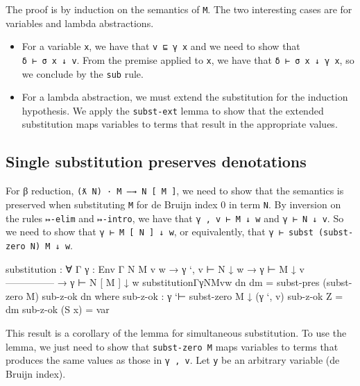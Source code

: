 The proof is by induction on the semantics of \texttt{M}. The two
interesting cases are for variables and lambda abstractions.

\begin{itemize}
\item
  For a variable \texttt{x}, we have that \texttt{v\ ⊑\ γ\ x} and we
  need to show that \texttt{δ\ ⊢\ σ\ x\ ↓\ v}. From the premise applied
  to \texttt{x}, we have that \texttt{δ\ ⊢\ σ\ x\ ↓\ γ\ x}, so we
  conclude by the \texttt{sub} rule.
\item
  For a lambda abstraction, we must extend the substitution for the
  induction hypothesis. We apply the \texttt{subst-ext} lemma to show
  that the extended substitution maps variables to terms that result in
  the appropriate values.
\end{itemize}

\hypertarget{single-substitution-preserves-denotations}{%
\subsection{Single substitution preserves
denotations}\label{single-substitution-preserves-denotations}}

For β reduction, \texttt{(ƛ\ N)\ ·\ M\ —→\ N\ {[}\ M\ {]}}, we need to
show that the semantics is preserved when substituting \texttt{M} for de
Bruijn index 0 in term \texttt{N}. By inversion on the rules
\texttt{↦-elim} and \texttt{↦-intro}, we have that
\texttt{γ\ ,\ v\ ⊢\ M\ ↓\ w} and \texttt{γ\ ⊢\ N\ ↓\ v}. So we need to
show that \texttt{γ\ ⊢\ M\ {[}\ N\ {]}\ ↓\ w}, or equivalently, that
\texttt{γ\ ⊢\ subst\ (subst-zero\ N)\ M\ ↓\ w}.

\begin{fence}
\begin{code}
substitution : ∀ {Γ} {γ : Env Γ} {N M v w}
   → γ `, v ⊢ N ↓ w
   → γ ⊢ M ↓ v
     ---------------
   → γ ⊢ N [ M ] ↓ w
substitution{Γ}{γ}{N}{M}{v}{w} dn dm =
  subst-pres (subst-zero M) sub-z-ok dn
  where
  sub-z-ok : γ `⊢ subst-zero M ↓ (γ `, v)
  sub-z-ok Z = dm
  sub-z-ok (S x) = var
\end{code}
\end{fence}

This result is a corollary of the lemma for simultaneous substitution.
To use the lemma, we just need to show that \texttt{subst-zero\ M} maps
variables to terms that produces the same values as those in
\texttt{γ\ ,\ v}. Let \texttt{y} be an arbitrary variable (de Bruijn
index).

